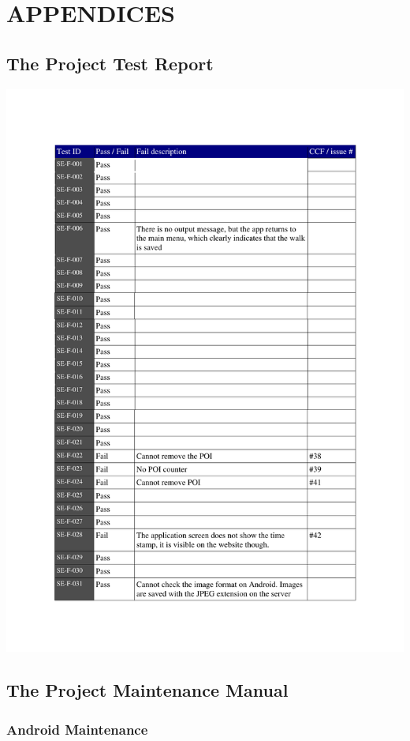 \documentclass[12pt]{article}
\begin{document}
\section{APPENDICES}
\subsection{The Project Test Report}
\includegraphics[scale=0.7]{testlog.pdf}


\subsection{The Project Maintenance Manual}
\subsubsection{Android Maintenance}
\end{document}
